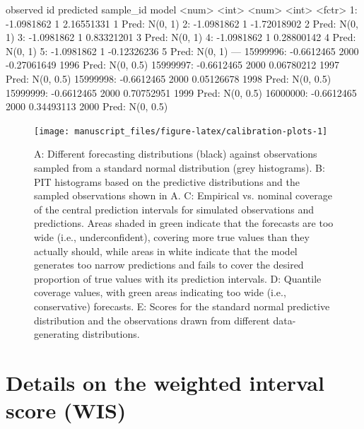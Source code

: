\documentclass[
]{jss}
\begin{document}
\begin{CodeChunk}
\begin{CodeOutput}

            observed    id   predicted sample_id           model
               <num> <int>       <num>     <int>          <fctr>
       1: -1.0981862     1  2.16551331         1   Pred: N(0, 1)
       2: -1.0981862     1 -1.72018902         2   Pred: N(0, 1)
       3: -1.0981862     1  0.83321201         3   Pred: N(0, 1)
       4: -1.0981862     1  0.28800142         4   Pred: N(0, 1)
       5: -1.0981862     1 -0.12326236         5   Pred: N(0, 1)
      ---                                                       
15999996: -0.6612465  2000 -0.27061649      1996 Pred: N(0, 0.5)
15999997: -0.6612465  2000  0.06780212      1997 Pred: N(0, 0.5)
15999998: -0.6612465  2000  0.05126678      1998 Pred: N(0, 0.5)
15999999: -0.6612465  2000  0.70752951      1999 Pred: N(0, 0.5)
16000000: -0.6612465  2000  0.34493113      2000 Pred: N(0, 0.5)
\end{CodeOutput}
\begin{figure}[!h]

{\centering \texttt{[image: manuscript\_files/figure-latex/calibration-plots-1]} 

}

\caption[A]{A: Different forecasting distributions (black) against observations sampled from a standard normal distribution (grey histograms). B: PIT histograms based on the predictive distributions and the sampled observations shown in A. C: Empirical vs. nominal coverage of the central prediction intervals for simulated observations and predictions. Areas shaded in green indicate that the forecasts are too wide (i.e., underconfident), covering more true values than they actually should, while areas in white indicate that the model generates too narrow predictions and fails to cover the desired proportion of true values with its prediction intervals. D: Quantile coverage values, with green areas indicating too wide (i.e., conservative) forecasts. E: Scores for the standard normal predictive distribution and the observations drawn from different data-generating distributions.}\label{fig:calibration-plots}
\end{figure}
\end{CodeChunk}

\clearpage

\section{Details on the weighted interval score (WIS)} \label{sec:wis}
\end{document}

